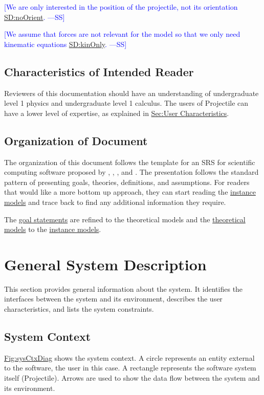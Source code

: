 \documentclass[12pt]{article}
\newcommand{\authornote}[3]{\textcolor{#1}{[#3 ---#2]}}
\newcommand{\authornote}[3]{}
\newcommand{\wss}[1]{\authornote{blue}{SS}{#1}}
\begin{document}
\wss{We are only interested in the position of the projectile, not
its orientation \hyperref[SD:noOrient]{SD:noOrient}.} %

\wss{We assume that forces are not relevant for the model so that we only need kinematic equations \hyperref[SD:kinOnly]{SD:kinOnly}.}

\subsection{Characteristics of Intended Reader}
\label{Sec:ReaderChars}
Reviewers of this documentation should have an understanding of undergraduate level 1 physics and undergraduate level 1 calculus. The users of Projectile can have a lower level of expertise, as explained in \hyperref[Sec:UserChars]{Sec:User Characteristics}.

\subsection{Organization of Document}
\label{Sec:DocOrg}
The organization of this document follows the template for an SRS for scientific computing software proposed by \cite{koothoor2013}, \cite{smithLai2005}, \cite{smithEtAl2007}, and \cite{smithKoothoor2016}. The presentation follows the standard pattern of presenting goals, theories, definitions, and assumptions. For readers that would like a more bottom up approach, they can start reading the \hyperref[Sec:IMs]{instance models} and trace back to find any additional information they require.

The \hyperref[Sec:GoalStmt]{goal statements} are refined to the theoretical models and the \hyperref[Sec:TMs]{theoretical models} to the \hyperref[Sec:IMs]{instance models}.

\section{General System Description}
\label{Sec:GenSysDesc}
This section provides general information about the system. It identifies the interfaces between the system and its environment, describes the user characteristics, and lists the system constraints.

\subsection{System Context}
\label{Sec:SysContext}
\hyperref[Figure:sysCtxDiag]{Fig:sysCtxDiag} shows the system context. A circle represents an entity external to the software, the user in this case. A rectangle represents the software system itself (Projectile). Arrows are used to show the data flow between the system and its environment.
\end{document}
